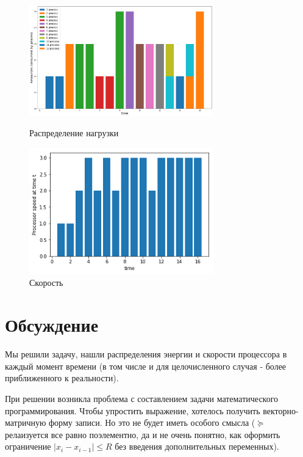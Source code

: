 \documentclass{article}
\begin{document}
\begin{figure}[h]
\begin{center}
\begin{minipage}[h]{8cm}
\includegraphics[width=8cm]{ECOSBB_2.png}
\caption{Распределение нагрузки} %
\label{ris:experimoriginal} %
\end{minipage}
\hfill 
\begin{minipage}[h]{8cm}
\includegraphics[width=8cm]{ECOSBB_3.png}
\caption{Скорость}
\label{ris:experimcoded}
\end{minipage}
\end{center}
\end{figure}


\section{Обсуждение}

Мы решили задачу, нашли распределения энергии и скорости процессора в каждый момент времени (в том числе и для целочисленного случая - более приближенного к реальности).

При решении возникла проблема с составлением задачи математического программирования. Чтобы упростить выражение, хотелось получить векторно-матричную форму записи. Но это не будет иметь особого смысла ($\succeq$ релаизуется все равно поэлементно, да и не очень понятно, как оформить ограничение $|x_i-x_{i-1}| \le R$ без введения дополнительных переменных). \\
\end{document}
